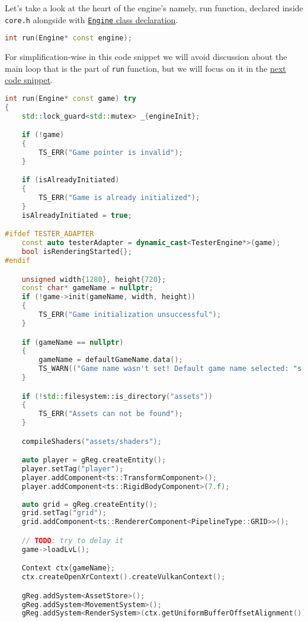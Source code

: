 \label{sec:run_fun}
Let's take a look at the heart of the engine's namely, run function, declared inside \texttt{core.h} alongside with \hyperref[sec:engine_class]{\texttt{Engine} class declaration}.
\begin{lstlisting}[language=c++, caption=Run function (./engine/include/tsengine/core.h)]
int run(Engine* const engine);
\end{lstlisting}
For simplification-wise in this code snippet we will avoid discussion about the main loop that is the part of \texttt{run} function, but we will focus on it in the \hyperref[main_loop]{next code snippet}.
\begin{lstlisting}[language=c++, caption=Engine's run function (./engine/src/core/core.cpp)]
int run(Engine* const game) try
{
    std::lock_guard<std::mutex> _{engineInit};

    if (!game)
    {
        TS_ERR("Game pointer is invalid");
    }

    if (isAlreadyInitiated)
    {
        TS_ERR("Game is already initialized");
    }
    isAlreadyInitiated = true;

#ifdef TESTER_ADAPTER
    const auto testerAdapter = dynamic_cast<TesterEngine*>(game);
    bool isRenderingStarted{};
#endif

    unsigned width{1280}, height{720};
    const char* gameName = nullptr;
    if (!game->init(gameName, width, height))
    {
        TS_ERR("Game initialization unsuccessful");
    }

    if (gameName == nullptr)
    {
        gameName = defaultGameName.data();
        TS_WARN(("Game name wasn't set! Default game name selected: "s + gameName).c_str());
    }

    if (!std::filesystem::is_directory("assets"))
    {
        TS_ERR("Assets can not be found");
    }

    compileShaders("assets/shaders");

    auto player = gReg.createEntity();
    player.setTag("player");
    player.addComponent<ts::TransformComponent>();
    player.addComponent<ts::RigidBodyComponent>(7.f);
    
    auto grid = gReg.createEntity();
    grid.setTag("grid");
    grid.addComponent<ts::RendererComponent<PipelineType::GRID>>();

    // TODO: try to delay it
    game->loadLvL();

    Context ctx{gameName};
    ctx.createOpenXrContext().createVulkanContext();

    gReg.addSystem<AssetStore>();
    gReg.addSystem<MovementSystem>();
    gReg.addSystem<RenderSystem>(ctx.getUniformBufferOffsetAlignment());


\end{lstlisting}
